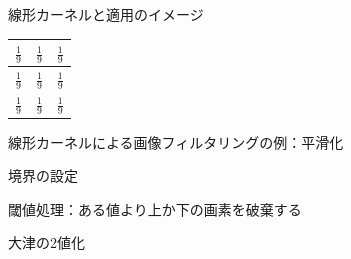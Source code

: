 \documentclass[10pt]{beamer}
\begin{document}
	\begin{frame}{線形カーネルと適用のイメージ}
		\begin{center}
			\begin{tabular}{|c|c|c|}\hline
				$\frac{1}{9}$ & $\frac{1}{9}$ & $\frac{1}{9}$ \\ \hline
				$\frac{1}{9}$ & $\frac{1}{9}$ & $\frac{1}{9}$ \\ \hline
				$\frac{1}{9}$ & $\frac{1}{9}$ & $\frac{1}{9}$ \\ \hline
			\end{tabular}
		\end{center}
	\end{frame}

	\begin{frame}{線形カーネルによる画像フィルタリングの例：平滑化}

	\end{frame}
	
	\begin{frame}{境界の設定}
		
	\end{frame}
	
	\begin{frame}{閾値処理：ある値より上か下の画素を破棄する}
		
	\end{frame}
	
	\begin{frame}{大津の2値化}
		
	\end{frame}
\end{document}
